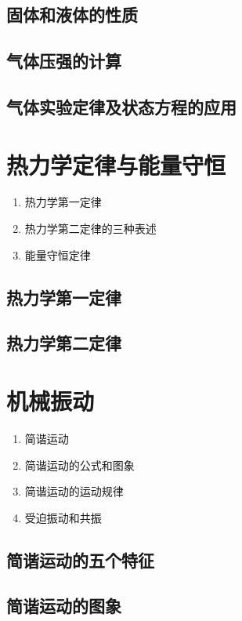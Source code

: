 \documentclass[cn,11pt, simple]{elegantbook}
\begin{document}
\clearpage\section{固体和液体的性质}

\clearpage\section{气体压强的计算}

\clearpage\section{气体实验定律及状态方程的应用}

\chapter{热力学定律与能量守恒}
\begin{enumerate}
   \item 热力学第一定律
   \item 热力学第二定律的三种表述
   \item 能量守恒定律
\end{enumerate}

\clearpage\section{热力学第一定律}

\clearpage\section{热力学第二定律}

\chapter{机械振动}
\begin{enumerate}
   \item 简谐运动
   \item 简谐运动的公式和图象
   \item 简谐运动的运动规律
   \item 受迫振动和共振
\end{enumerate}

\clearpage\section{简谐运动的五个特征}

\clearpage\section{简谐运动的图象}
\end{document}
